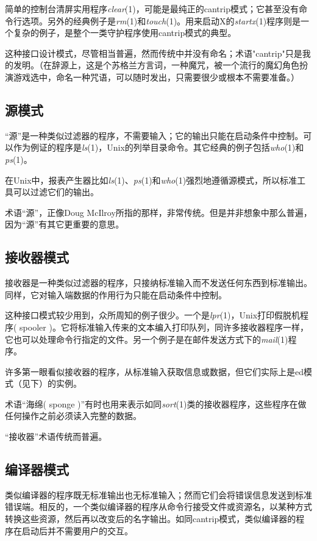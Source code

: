 \documentclass[12pt,oneside]{book}
\begin{document}
\begin{common-format}
简单的控制台清屏实用程序\textit{clear}(1)，可能是最纯正的cantrip模式；它甚至没有命令行选项。另外的经典例子是\textit{rm}(1)和\textit{touch}(1)。用来启动X的\textit{startx}(1)程序则是一个复杂的例子，是整个一类守护程序使用cantrip模式的典型。

这种接口设计模式，尽管相当普遍，然而传统中并没有命名；术语"cantrip"只是我的发明。（在辞源上，这是个苏格兰方言词，一种魔咒，被一个流行的魔幻角色扮演游戏选中，命名一种咒语，可以随时发出，只需要很少或根本不需要准备。）

\subsection{源模式}
“源”是一种类似过滤器的程序，不需要输入；它的输出只能在启动条件中控制。可以作为例证的程序是\textit{ls}(1)，Unix的列举目录命令。其它经典的例子包括\textit{who}(1)和\textit{ps}(1)。

在Unix中，报表产生器比如\textit{ls}(1)、\textit{ps}(1)和\textit{who}(1)强烈地遵循源模式，所以标准工具可以过滤它们的输出。

术语“源”，正像Doug McIlroy所指的那样，非常传统。但是并非想象中那么普遍，因为“源”有其它更重要的意思。


\subsection{接收器模式}
接收器是一种类似过滤器的程序，只接纳标准输入而不发送任何东西到标准输出。同样，它对输入端数据的作用行为只能在启动条件中控制。

这种接口模式较少用到，众所周知的例子很少。一个是\textit{lpr}(1)，Unix打印假脱机程序( spooler )。它将标准输入传来的文本编入打印队列，同许多接收器程序一样，它也可以处理命令行指定的文件。另一个例子是在邮件发送方式下的\textit{mail}(1)程序。

许多第一眼看似接收器的程序，从标准输入获取信息或数据，但它们实际上是ed模式（见下）的实例。

术语“海绵( sponge )”有时也用来表示如同\textit{sort}(1)类的接收器程序，这些程序在做任何操作之前必须读入完整的数据。

“接收器”术语传统而普遍。

\subsection{编译器模式}
类似编译器的程序既无标准输出也无标准输入；然而它们会将错误信息发送到标准错误端。相反的，一个类似编译器的程序从命令行接受文件或资源名，以某种方式转换这些资源，然后再以改变后的名字输出。如同cantrip模式，类似编译器的程序在启动后并不需要用户的交互。


\end{common-format}
\end{document}
